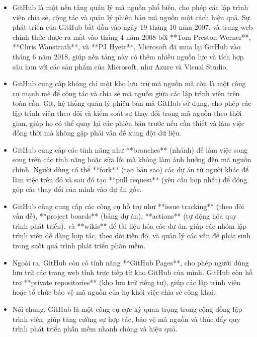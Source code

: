 \begin{itemize}
\item GitHub là một nền tảng quản lý mã nguồn phổ biến, cho phép các lập trình viên chia sẻ, cộng tác và quản lý phiên bản mã nguồn một cách hiệu quả. Sự phát triển của GitHub bắt đầu vào ngày 19 tháng 10 năm 2007, và trang web chính thức được ra mắt vào tháng 4 năm 2008 bởi **Tom Preston-Werner**, **Chris Wanstrath**, và **PJ Hyett**. Microsoft đã mua lại GitHub vào tháng 6 năm 2018, giúp nền tảng này có thêm nhiều nguồn lực và tích hợp sâu hơn với các sản phẩm của Microsoft, như Azure và Visual Studio. 

\item GitHub cung cấp không chỉ một kho lưu trữ mã nguồn mà còn là một công cụ mạnh mẽ để cộng tác và chia sẻ mã nguồn giữa các lập trình viên trên toàn cầu. Git, hệ thống quản lý phiên bản mà GitHub sử dụng, cho phép các lập trình viên theo dõi và kiểm soát sự thay đổi trong mã nguồn theo thời gian, giúp họ có thể quay lại các phiên bản trước nếu cần thiết và làm việc đồng thời mà không gặp phải vấn đề xung đột dữ liệu.

\item GitHub cung cấp các tính năng như **branches** (nhánh) để làm việc song song trên các tính năng hoặc sửa lỗi mà không làm ảnh hưởng đến mã nguồn chính. Người dùng có thể **fork** (tạo bản sao) các dự án từ người khác để làm việc trên đó và sau đó tạo **pull request** (yêu cầu hợp nhất) để đóng góp các thay đổi của mình vào dự án gốc.

\item GitHub cũng cung cấp các công cụ hỗ trợ như **issue tracking** (theo dõi vấn đề), **project boards** (bảng dự án), **actions** (tự động hóa quy trình phát triển), và **wikis** để tài liệu hóa các dự án, giúp các nhóm lập trình viên dễ dàng hợp tác, theo dõi tiến độ, và quản lý các vấn đề phát sinh trong suốt quá trình phát triển phần mềm.

\item Ngoài ra, GitHub còn có tính năng **GitHub Pages**, cho phép người dùng lưu trữ các trang web tĩnh trực tiếp từ kho GitHub của mình. GitHub còn hỗ trợ **private repositories** (kho lưu trữ riêng tư), giúp các lập trình viên hoặc tổ chức bảo vệ mã nguồn của họ khỏi việc chia sẻ công khai.

\item Nói chung, GitHub là một công cụ cực kỳ quan trọng trong cộng đồng lập trình viên, giúp tăng cường sự hợp tác, bảo vệ mã nguồn và thúc đẩy quy trình phát triển phần mềm nhanh chóng và hiệu quả.
\end{itemize}


